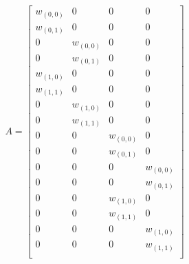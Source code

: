 

\begin{align*}
    A =
    \begin{bmatrix}
        w_{(0,0)} & 0 & 0 & 0 \\
        w_{(0,1)} & 0 & 0 & 0 \\
        0 & w_{(0,0)} & 0 & 0 \\
        0 & w_{(0,1)} & 0 & 0 \\
        w_{(1,0)} & 0 & 0 & 0 \\
        w_{(1,1)} & 0 & 0 & 0 \\
        0 & w_{(1,0)} & 0 & 0 \\
        0 & w_{(1,1)} & 0 & 0 \\
        0 & 0 & w_{(0,0)} & 0 \\
        0 & 0 & w_{(0,1)} & 0 \\
        0 & 0 & 0 & w_{(0,0)} \\
        0 & 0 & 0 & w_{(0,1)} \\
        0 & 0 & w_{(1,0)} & 0 \\
        0 & 0 & w_{(1,1)} & 0 \\
        0 & 0 & 0 & w_{(1,0)} \\
        0 & 0 & 0 & w_{(1,1)} \\
    \end{bmatrix}
\end{align*}

